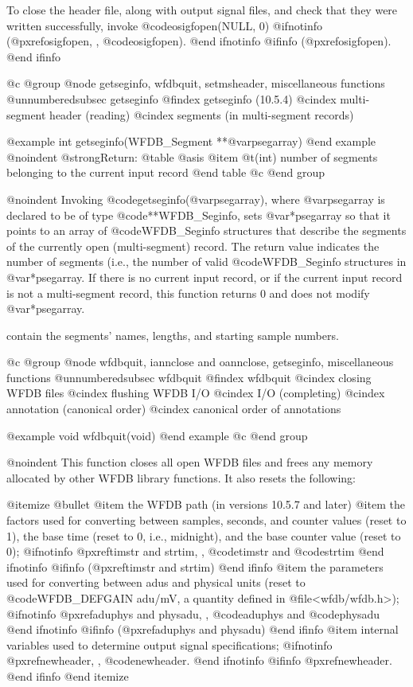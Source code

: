 {{{{{{{{To close the header file, along with output signal files, and check that they
were written successfully, invoke @code{osigfopen(NULL, 0)}
@ifnotinfo
(@pxref{osigfopen, , @code{osigfopen}}).
@end ifnotinfo
@ifinfo
(@pxref{osigfopen}).
@end ifinfo

@c @group
@node     getseginfo, wfdbquit, setmsheader, miscellaneous functions
@unnumberedsubsec getseginfo
@findex getseginfo (10.5.4)
@cindex multi-segment header (reading)
@cindex segments (in multi-segment records)

@example
int getseginfo(WFDB_Segment **@var{psegarray})
@end example
@noindent
@strong{Return:}
@table @asis
@item @t{(int)}
number of segments belonging to the current input record
@end table
@c @end group

@noindent
Invoking @code{getseginfo(@var{psegarray})}, where @var{psegarray} is
declared to be of type @code{**WFDB_Seginfo}, sets @var{*psegarray} so
that it points to an array of @code{WFDB_Seginfo} structures that
describe the segments of the currently open (multi-segment) record.
The return value indicates the number of segments (i.e., the number
of valid @code{WFDB_Seginfo} structures in @var{*psegarray}.  If
there is no current input record, or if the current input record is
not a multi-segment record, this function returns 0 and does not modify
@var{*psegarray}.

contain the segments' names, lengths, and starting sample numbers.

@c @group
@node     wfdbquit, iannclose and oannclose, getseginfo, miscellaneous functions
@unnumberedsubsec wfdbquit
@findex wfdbquit
@cindex closing WFDB files
@cindex flushing WFDB I/O
@cindex I/O (completing)
@cindex annotation (canonical order)
@cindex canonical order of annotations

@example
void wfdbquit(void)
@end example
@c @end group

@noindent
This function closes all open WFDB files and frees any memory allocated by
other WFDB library functions.  It also resets the following:

@itemize @bullet
@item
the WFDB path (in versions 10.5.7 and later)
@item
the factors used for converting between samples, seconds, and counter
values (reset to 1), the base time (reset to 0, i.e., midnight), and the
base counter value (reset to 0);
@ifnotinfo
@pxref{timstr and strtim, , @code{timstr} and @code{strtim}}
@end ifnotinfo
@ifinfo
(@pxref{timstr and strtim})
@end ifinfo
@item
the parameters used for converting between adus and physical units (reset to
@code{WFDB_DEFGAIN} adu/mV, a quantity defined in @file{<wfdb/wfdb.h>});
@ifnotinfo
@pxref{aduphys and physadu, , @code{aduphys} and @code{physadu}}
@end ifnotinfo
@ifinfo
(@pxref{aduphys and physadu})
@end ifinfo
@item
internal variables used to determine output signal specifications;
@ifnotinfo
@pxref{newheader, , @code{newheader}}.
@end ifnotinfo
@ifinfo
@pxref{newheader}.
@end ifinfo
@end itemize

}}}}}}}}

